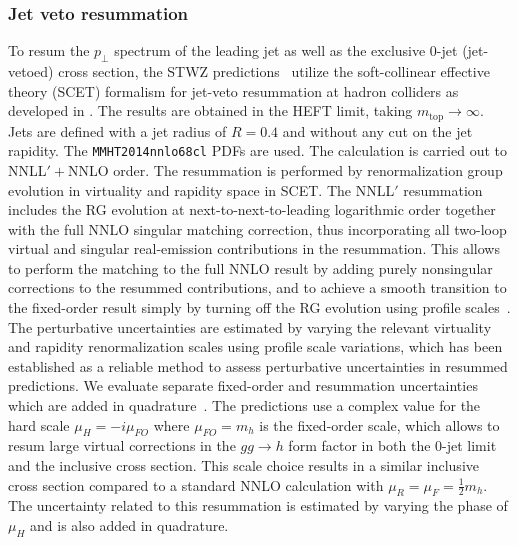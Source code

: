 \subsubsection{Jet veto resummation}
\label{sec:hjetscomp:tools:ares:jvres}

To resum the $p_\perp$ spectrum of the leading jet as well as the exclusive $0$-jet
(jet-vetoed) cross section, the STWZ predictions~\cite{Stewart:2013faa} utilize
the soft-collinear effective theory (SCET) formalism for jet-veto resummation at
hadron colliders as developed in \cite{Stewart:2009yx, Berger:2010xi,
Tackmann:2012bt, Stewart:2013faa}. The results are obtained in the HEFT 
limit, taking $m_\text{top}\to\infty$.
Jets are defined with a jet radius of $R = 0.4$ and without any cut on the jet
rapidity. The \texttt{MMHT2014nnlo68cl} PDFs are used. The calculation is carried out to
NNLL$'+$NNLO order. The resummation is performed by renormalization group
evolution in virtuality and rapidity space in SCET. The NNLL$'$ resummation
includes the RG evolution at next-to-next-to-leading logarithmic order together
with the full NNLO singular matching correction, thus incorporating all two-loop
virtual and singular real-emission contributions in the resummation. This allows
to perform the matching to the full NNLO result by adding purely nonsingular
corrections to the resummed contributions, and to achieve a smooth transition to
the fixed-order result simply by turning off the RG evolution using profile
scales~\cite{Ligeti:2008ac, Abbate:2010xh}. The perturbative uncertainties are
estimated by varying the relevant virtuality and rapidity renormalization scales
using profile scale variations, which has been established as a reliable method
to assess perturbative uncertainties in resummed predictions. We evaluate
separate fixed-order and resummation uncertainties which are added in
quadrature~\cite{Berger:2010xi, Stewart:2011cf, Stewart:2013faa}.
The predictions use a complex value for the hard scale $\mu_H = -i \mu_{FO}$ where
$\mu_{FO} = m_h$ is the fixed-order scale, which allows to resum large virtual
corrections in the $gg\to h$ form factor in both the 0-jet limit and the
inclusive cross section. This scale choice results in a similar 
inclusive cross section compared to a standard NNLO calculation with 
$\mu_R=\mu_F=\tfrac{1}{2}m_h$. The uncertainty related to this resummation is
estimated by varying the phase of $\mu_H$ and is also added in quadrature.

